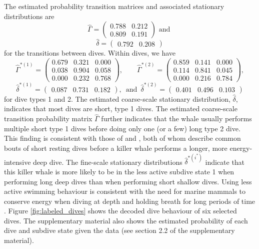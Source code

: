 The estimated probability transition matrices and associated stationary distributions are
%
$$\hat \Gamma = \begin{pmatrix} 
0.788 & 0.212 \\
0.809 & 0.191
\end{pmatrix} \text{ and }$$
$$\hat \delta = \begin{pmatrix} 0.792 & 0.208 \end{pmatrix}$$
%
for the transitions between dives. Within dives, we have
$$\hat \Gamma^{*(1)} = \begin{pmatrix} 
0.679 & 0.321 & 0.000 \\
0.038 & 0.904 & 0.058 \\
0.000 & 0.232 & 0.768
\end{pmatrix}, \qquad 
\hat \Gamma^{*(2)} = \begin{pmatrix} 
0.859 & 0.141 & 0.000 \\
0.114 & 0.841 & 0.045 \\
0.000 & 0.216 & 0.784
\end{pmatrix},$$
$$\hat \delta^{*(1)} = \begin{pmatrix} 0.087 & 0.731 & 0.182 \end{pmatrix}, \enspace \text{and} \enspace \hat \delta^{*(2)} = \begin{pmatrix} 0.401 & 0.496 & 0.103 \end{pmatrix}$$
%
for dive types 1 and 2.
The estimated coarse-scale stationary distribution, $\hat{\delta}$, indicates that most dives are short, type 1 dives. The estimated coarse-scale transition probability matrix $\hat \Gamma$ further indicates that the whale usually performs multiple short type 1 dives before doing only one (or a few) long type 2 dive. This finding is consistent with those of \citet{Tennessen:2019b} and \citet{Williams:2009}, both of whom describe common bouts of short resting dives before a killer whale performs a longer, more energy-intensive deep dive. The fine-scale stationary distributions $\hat{\delta}^{*(i^*)}$ indicate that this killer whale is more likely to be in the less active subdive state 1 when performing long deep dives than when performing short shallow dives. Using less active swimming behaviour is consistent with the need for marine mammals to conserve energy when diving at depth and holding breath for long periods of time \citep{Williams:1999,Hastie:2006}. Figure \ref{fig:labeled_dives} shows the decoded dive behaviour of six selected dives. The supplementary material also shows the estimated probability of each dive and subdive state given the data (see section 2.2 of the supplementary material).

